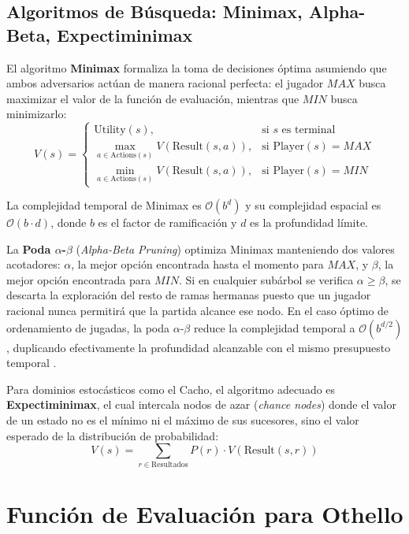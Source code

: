 \documentclass[10pt,a4paper]{article}
\begin{document}
\subsection{Algoritmos de Búsqueda: Minimax, Alpha-Beta, Expectiminimax}
El algoritmo \textbf{Minimax} formaliza la toma de decisiones óptima asumiendo que ambos adversarios actúan de manera racional perfecta: el jugador $MAX$ busca maximizar el valor de la función de evaluación, mientras que $MIN$ busca minimizarlo:
\begin{equation}
    V(s) = 
    \begin{cases}
        \text{Utility}(s), & \text{si } s \text{ es terminal} \\
        \max_{a \in \text{Actions}(s)} V(\text{Result}(s, a)), & \text{si } \text{Player}(s) = MAX \\
        \min_{a \in \text{Actions}(s)} V(\text{Result}(s, a)), & \text{si } \text{Player}(s) = MIN
    \end{cases}
\end{equation}

La complejidad temporal de Minimax es $\mathcal{O}(b^d)$ y su complejidad espacial es $\mathcal{O}(b \cdot d)$, donde $b$ es el factor de ramificación y $d$ es la profundidad límite.

La \textbf{Poda $\alpha$-$\beta$} (\textit{Alpha-Beta Pruning}) optimiza Minimax manteniendo dos valores acotadores: $\alpha$, la mejor opción encontrada hasta el momento para $MAX$, y $\beta$, la mejor opción encontrada para $MIN$. Si en cualquier subárbol se verifica $\alpha \ge \beta$, se descarta la exploración del resto de ramas hermanas puesto que un jugador racional nunca permitirá que la partida alcance ese nodo. En el caso óptimo de ordenamiento de jugadas, la poda $\alpha$-$\beta$ reduce la complejidad temporal a $\mathcal{O}(b^{d/2})$, duplicando efectivamente la profundidad alcanzable con el mismo presupuesto temporal \cite{russell2020artificial}.

Para dominios estocásticos como el Cacho, el algoritmo adecuado es \textbf{Expectiminimax}, el cual intercala nodos de azar (\textit{chance nodes}) donde el valor de un estado no es el mínimo ni el máximo de sus sucesores, sino el valor esperado de la distribución de probabilidad:
\begin{equation}
    V(s) = \sum_{r \in \text{Resultados}} P(r) \cdot V(\text{Result}(s, r))
\end{equation}

\section{Función de Evaluación para Othello}
\end{document}
